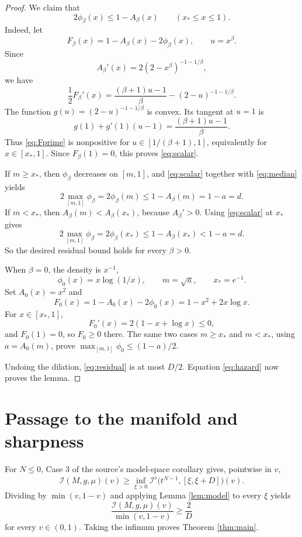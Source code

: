 \documentclass[11pt]{article}
\newcommand{\Ical}{\mathcal I}
\newcommand{\Jcal}{\mathcal I^\flat}
\begin{document}
\begin{proof}
We claim that
\begin{equation}\label{eq:scalar}
 2\phi_\beta(x)\le1-A_\beta(x)
 \qquad(x_*\le x\le1).
\end{equation}
Indeed, let
\[
 F_\beta(x)=1-A_\beta(x)-2\phi_\beta(x),\qquad u=x^\beta.
\]
Since
\[
 A_\beta'(x)=2(2-x^\beta)^{-1-1/\beta},
\]
we have
\begin{equation}\label{eq:Fprime}
 \frac12F_\beta'(x)
 =\frac{(\beta+1)u-1}{\beta}
  -(2-u)^{-1-1/\beta}.
\end{equation}
The function \(g(u)=(2-u)^{-1-1/\beta}\) is convex.  Its tangent at
\(u=1\) is
\[
 g(1)+g'(1)(u-1)
 =\frac{(\beta+1)u-1}{\beta}.
\]
Thus \eqref{eq:Fprime} is nonpositive for
\(u\in[1/(\beta+1),1]\), equivalently for \(x\in[x_*,1]\).  Since
\(F_\beta(1)=0\), this proves \eqref{eq:scalar}.

If \(m\ge x_*\), then \(\phi_\beta\) decreases on \([m,1]\), and
\eqref{eq:scalar} together with \eqref{eq:median} yields
\[
 2\max_{[m,1]}\phi_\beta
 =2\phi_\beta(m)\le1-A_\beta(m)=1-a=d.
\]
If \(m<x_*\), then \(A_\beta(m)<A_\beta(x_*)\), because \(A_\beta'>0\).
Using \eqref{eq:scalar} at \(x_*\) gives
\[
 2\max_{[m,1]}\phi_\beta
 =2\phi_\beta(x_*)\le1-A_\beta(x_*)<1-a=d.
\]
So the desired residual bound holds for every \(\beta>0\).

When \(\beta=0\), the density is \(x^{-1}\),
\[
 \phi_0(x)=x\log(1/x),\qquad m=\sqrt a,\qquad x_*=e^{-1}.
\]
Set \(A_0(x)=x^2\) and
\[
 F_0(x)=1-A_0(x)-2\phi_0(x)=1-x^2+2x\log x.
\]
For \(x\in[x_*,1]\),
\[
 F_0'(x)=2(1-x+\log x)\le0,
\]
and \(F_0(1)=0\), so \(F_0\ge0\) there.  The same two cases
\(m\ge x_*\) and \(m<x_*\), using \(a=A_0(m)\), prove
\(\max_{[m,1]}\phi_0\le(1-a)/2\).

Undoing the dilation, \eqref{eq:residual} is at most \(D/2\).
Equation \eqref{eq:hazard} now proves the lemma.
\end{proof}

\section*{Passage to the manifold and sharpness}

For \(N\le0\), Case 3 of the source's model-space corollary gives, pointwise
in \(v\),
\[
 \Ical(M,g,\mu)(v)
 \ge\inf_{\xi>0}
 \Jcal\bigl(t^{N-1},[\xi,\xi+D]\bigr)(v).
\]
Dividing by \(\min(v,1-v)\) and applying Lemma \ref{lem:model} to every
\(\xi\) yields
\[
 \frac{\Ical(M,g,\mu)(v)}{\min(v,1-v)}\ge\frac2D
\]
for every \(v\in(0,1)\).  Taking the infimum proves Theorem
\ref{thm:main}.
\end{document}
